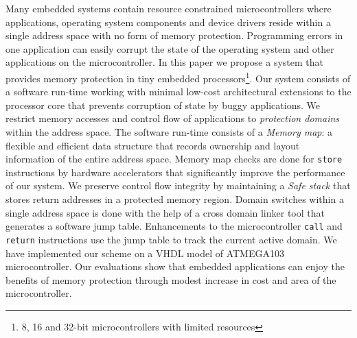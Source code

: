 \noindent
Many embedded systems contain resource constrained microcontrollers where applications, operating system components and device drivers reside within a single address space with no form of memory protection.
%
Programming errors in one application can easily corrupt the state of the operating system and other applications on the microcontroller.
%
In this paper we propose a system that provides memory protection in tiny embedded processors\footnote{8, 16 and 32-bit microcontrollers with limited resources}.
%
Our system consists of a software run-time working with minimal low-cost architectural extensions to the processor core that prevents corruption of state by buggy applications.
%
We restrict memory accesses and control flow of applications to \textit{protection domains} within the address space.
%
The software run-time consists of a \textit{Memory map}: a flexible and efficient data structure that records ownership and layout information of the entire address space.
%
Memory map checks are done for \texttt{store} instructions by hardware accelerators that significantly improve the performance of our system.
%
We preserve control flow integrity by maintaining a \textit{Safe stack} that stores return addresses in a protected memory region.
%
Domain switches within a single address space is done with the help of a cross domain linker tool that generates a software jump table.
%
Enhancements to the microcontroller \texttt{call} and \texttt{return} instructions use the jump table to track the current active domain.
%
We have implemented our scheme on a VHDL model of ATMEGA103 microcontroller.
%
Our evaluations show that embedded applications can enjoy the benefits of memory protection through modest increase in cost and area of the microcontroller.
